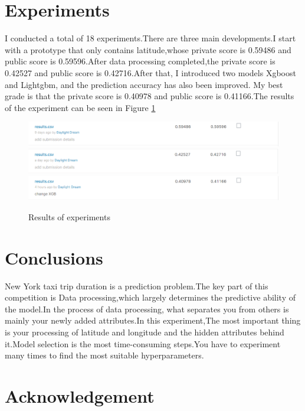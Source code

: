 \section{Experiments} \label{sec-experiment}
I conducted a total of 18 experiments.There are three main developments.I start with a prototype that only contains latitude,whose private score is 0.59486 and public score is 0.59596.After data processing completed,the private score is 0.42527 and public score is 0.42716.After that, I introduced two models Xgboost and Lightgbm, and the prediction accuracy has also been improved. My best grade is that the private score is 0.40978 and public score is 0.41166.The results of the experiment can be seen in Figure \ref{21}
\begin{figure}[htbp]
	\centering
	\includegraphics[scale=0.4]{figures/21.eps}
	\includegraphics[scale=0.4]{figures/22.eps}				\includegraphics[scale=0.4]{figures/23.eps}
	\caption{ Results of experiments } \label{21}
\end{figure}  


\section{Conclusions} \label{sec-conclusions}
New York taxi trip duration is a prediction problem.The key part of this competition is Data processing,which largely determines the predictive ability of the model.In the process of data processing, what separates you from others is mainly your newly added attributes.In this experiment,The most important thing is your processing of latitude and longitude and the hidden attributes behind it.Model selection is the most time-consuming steps.You have to experiment many times to find the most suitable hyperparameters.

\section*{Acknowledgement}

%
%

